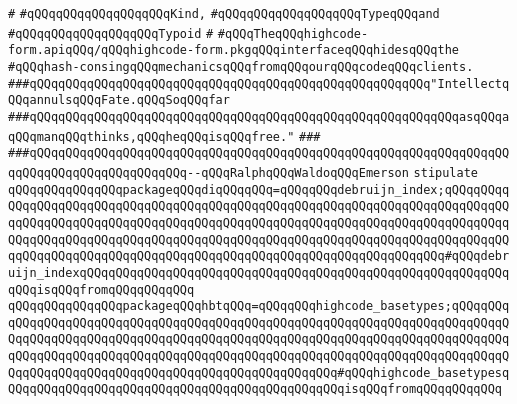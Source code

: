 \verb|#|\newline
\verb|#qQQqqQQqqQQqqQQqqQQqKind,|\newline
\verb|#qQQqqQQqqQQqqQQqqQQqTypeqQQqand|\newline
\verb|#qQQqqQQqqQQqqQQqqQQqTypoid|\newline
\verb|#|\newline
\verb|#qQQqTheqQQqhighcode-form.apiqQQq/qQQqhighcode-form.pkgqQQqinterfaceqQQqhidesqQQqthe|\newline
\verb|#qQQqhash-consingqQQqmechanicsqQQqfromqQQqourqQQqcodeqQQqclients.|\newline
\newline
\newline
\verb|###qQQqqQQqqQQqqQQqqQQqqQQqqQQqqQQqqQQqqQQqqQQqqQQqqQQqqQQq"IntellectqQQqannulsqQQqFate.qQQqSoqQQqfar|\newline
\verb|###qQQqqQQqqQQqqQQqqQQqqQQqqQQqqQQqqQQqqQQqqQQqqQQqqQQqqQQqqQQqasqQQqaqQQqmanqQQqthinks,qQQqheqQQqisqQQqfree."|\newline
\verb|###|\newline
\verb|###qQQqqQQqqQQqqQQqqQQqqQQqqQQqqQQqqQQqqQQqqQQqqQQqqQQqqQQqqQQqqQQqqQQqqQQqqQQqqQQqqQQqqQQqqQQq--qQQqRalphqQQqWaldoqQQqEmerson|\newline
\newline
\newline
\newline
\verb|stipulate|\newline
\verb|qQQqqQQqqQQqqQQqpackageqQQqdiqQQqqQQq=qQQqqQQqdebruijn_index;qQQqqQQqqQQqqQQqqQQqqQQqqQQqqQQqqQQqqQQqqQQqqQQqqQQqqQQqqQQqqQQqqQQqqQQqqQQqqQQqqQQqqQQqqQQqqQQqqQQqqQQqqQQqqQQqqQQqqQQqqQQqqQQqqQQqqQQqqQQqqQQqqQQqqQQqqQQqqQQqqQQqqQQqqQQqqQQqqQQqqQQqqQQqqQQqqQQqqQQqqQQqqQQqqQQqqQQqqQQqqQQqqQQqqQQqqQQqqQQqqQQqqQQqqQQqqQQqqQQqqQQqqQQqqQQqqQQqqQQq#qQQqdebruijn_indexqQQqqQQqqQQqqQQqqQQqqQQqqQQqqQQqqQQqqQQqqQQqqQQqqQQqqQQqqQQqqQQqisqQQqfromqQQqqQQqqQQq|\newline
\verb|qQQqqQQqqQQqqQQqpackageqQQqhbtqQQq=qQQqqQQqhighcode_basetypes;qQQqqQQqqQQqqQQqqQQqqQQqqQQqqQQqqQQqqQQqqQQqqQQqqQQqqQQqqQQqqQQqqQQqqQQqqQQqqQQqqQQqqQQqqQQqqQQqqQQqqQQqqQQqqQQqqQQqqQQqqQQqqQQqqQQqqQQqqQQqqQQqqQQqqQQqqQQqqQQqqQQqqQQqqQQqqQQqqQQqqQQqqQQqqQQqqQQqqQQqqQQqqQQqqQQqqQQqqQQqqQQqqQQqqQQqqQQqqQQqqQQqqQQqqQQqqQQqqQQqqQQq#qQQqhighcode_basetypesqQQqqQQqqQQqqQQqqQQqqQQqqQQqqQQqqQQqqQQqqQQqqQQqisqQQqfromqQQqqQQqqQQq|\newline
